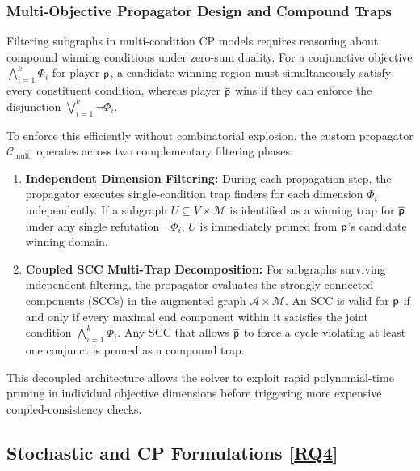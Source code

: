 \documentclass{article}
\begin{document}
\subsubsection{Multi-Objective Propagator Design and Compound Traps}
Filtering subgraphs in multi-condition CP models requires reasoning about compound winning conditions under zero-sum duality. For a conjunctive objective $\bigwedge_{i=1}^k \Phi_i$ for player $\mathsf{p}$, a candidate winning region must simultaneously satisfy every constituent condition, whereas player $\overline{\mathsf{p}}$ wins if they can enforce the disjunction $\bigvee_{i=1}^k \neg \Phi_i$.

To enforce this efficiently without combinatorial explosion, the custom propagator $\mathcal{C}_{\text{multi}}$ operates across two complementary filtering phases:
\begin{enumerate}
    \item \textbf{Independent Dimension Filtering:} During each propagation step, the propagator executes single-condition trap finders for each dimension $\Phi_i$ independently. If a subgraph $U \subseteq V \times \mathcal{M}$ is identified as a winning trap for $\overline{\mathsf{p}}$ under any single refutation $\neg \Phi_i$, $U$ is immediately pruned from $\mathsf{p}$'s candidate winning domain.
    \item \textbf{Coupled SCC Multi-Trap Decomposition:} For subgraphs surviving independent filtering, the propagator evaluates the strongly connected components (SCCs) in the augmented graph $\mathcal{A} \times \mathcal{M}$. An SCC is valid for $\mathsf{p}$ if and only if every maximal end component within it satisfies the joint condition $\bigwedge_{i=1}^k \Phi_i$. Any SCC that allows $\overline{\mathsf{p}}$ to force a cycle violating at least one conjunct is pruned as a compound trap.
\end{enumerate}
This decoupled architecture allows the solver to exploit rapid polynomial-time pruning in individual objective dimensions before triggering more expensive coupled-consistency checks.


\subsection{Stochastic \wregulargames and CP Formulations [\hyperref[sec:rq]{RQ4}]}\label{sec:stochastic_games}
\end{document}
